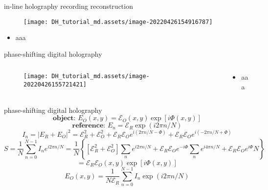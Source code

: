 \documentclass[t, aspectratio=169]{beamer}
\begin{document}
\begin{frame}{in-line holography}
	\hspace{30 mm} recording \hspace{50 mm} reconstruction
	\begin{figure}
		\texttt{[image: DH\_tutorial\_md.assets/image-20220426154916787]}
	\end{figure}
	\begin{itemize}
		\item aaa
	\end{itemize}
\end{frame}


\begin{frame}{phase-shifting digital holography}
	\begin{columns}
		\begin{column}{0.6\textwidth}
			\begin{figure}
				\texttt{[image: DH\_tutorial\_md.assets/image-20220426155721421]}
			\end{figure}
		\end{column}
		\begin{column}{0.4\textwidth}
			\begin{itemize}
				\item aaa
			\end{itemize}
		\end{column}
	\end{columns}
\end{frame}


\begin{frame}{phase-shifting digital holography}
\[ \textbf{object:   } E_O(x,y) = \mathcal{E}_O(x,y)\exp[i\Phi(x,y)] \]
\[ \textbf{reference:   } E_n = \mathcal{E}_R \exp(i2\pi n/N) \]
	\pause
\[ I_n = |E_R + E_O|^2 = \mathcal{E}_R^2 + \mathcal{E}_O^2 + \mathcal{E}_R\mathcal{E}_O e^{i(2\pi n/N-\Phi)} + \mathcal{E}_R\mathcal{E}_O e^{i(-2\pi n/N+\Phi)} \]
	\pause
\[ S=\frac{1}{N}\sum_{n=0}^{N-1} I_n e^{i2\pi n/N} = \frac{1}{N}\left\{\left[\mathcal{E}_R^2 + \mathcal{E}_O^2 \right]\sum_n e^{i2\pi n/N} + \mathcal{E}_R\mathcal{E}_O e^{-i\Phi}\sum_n e^{i4\pi n/N} + \mathcal{E}_R\mathcal{E}_O e^{i\Phi}N \right\} \]
\[ = \mathcal{E}_R\mathcal{E}_O(x,y)\exp[i\Phi(x,y)] \]
	\pause
\[ E_O(x,y) = \frac{1}{N\mathcal E_R}\sum_{n=0}^{N-1} I_n \exp(i2\pi n/N) \]
\end{frame}
\end{document}
